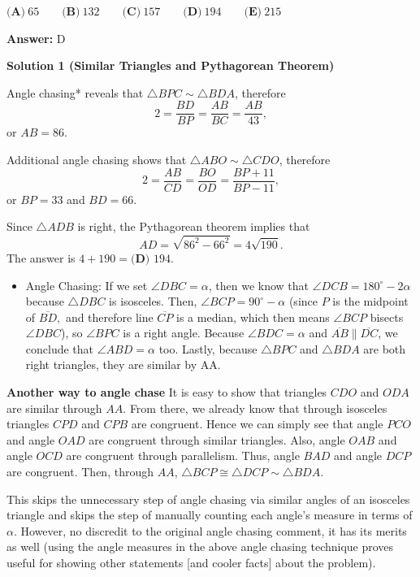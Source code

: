 \begin{enumerate}
 $\textbf{(A)} ~65\qquad\textbf{(B)} ~132\qquad\textbf{(C)} ~157\qquad\textbf{(D)} ~194\qquad\textbf{(E)} ~215$

 \textbf{Answer: }D



\textbf{Solution 1 (Similar Triangles and Pythagorean Theorem)}

Angle chasing* reveals that $\triangle BPC\sim\triangle BDA$, therefore 
 \[2=\frac{BD}{BP}=\frac{AB}{BC}=\frac{AB}{43},\]or $AB=86$.

 Additional angle chasing shows that $\triangle ABO\sim\triangle CDO$, therefore
 \[2=\frac{AB}{CD}=\frac{BO}{OD}=\frac{BP+11}{BP-11},\]or $BP=33$ and $BD=66$.

 Since $\triangle ADB$ is right, the Pythagorean theorem implies that
 \[AD=\sqrt{86^2-66^2}=4\sqrt{190}.\]The answer is $4+190=\boxed{\textbf{(D) }194}$.

 
            \begin{itemize}
        \item Angle Chasing: If we set $\angle DBC = \alpha$, then we know that $\angle DCB = 180^\circ-2\alpha$ because $\triangle DBC$ is isosceles. Then, $\angle BCP = 90^\circ-\alpha$ (since $P$ is the midpoint of $\overline{BD},$ and therefore line $\overline{CP}$ is a median, which then means $\angle BCP$ bisects $\angle DBC$), so $\angle BPC$ is a right angle. Because $\angle BDC = \alpha$ and $\overline{AB}\parallel\overline{DC}$, we conclude that $\angle ABD = \alpha$ too. Lastly, because $\triangle BPC$ and $\triangle BDA$ are both right triangles, they are similar by AA.
            \end{itemize}
            \textbf{Another way to angle chase} It is easy to show that triangles $CDO$ and $ODA$ are similar through $AA$. From there, we already know that through isosceles triangles $CPD$ and $CPB$ are congruent. Hence we can simply see that angle $PCO$ and angle $OAD$ are congruent through similar triangles. Also, angle $OAB$ and angle $OCD$ are congruent through parallelism. Thus, angle $BAD$ and angle $DCP$ are congruent. Then, through $AA$, $\triangle BCP \cong \triangle DCP \sim \triangle BDA$.

 This skips the unnecessary step of angle chasing via similar angles of an isosceles triangle and skips the step of manually counting each angle's measure in terms of $\alpha$. However, no discredit to the original angle chasing comment, it has its merits as well (using the angle measures in the above angle chasing technique proves useful for showing other statements [and cooler facts] about the problem).


\end{enumerate}
